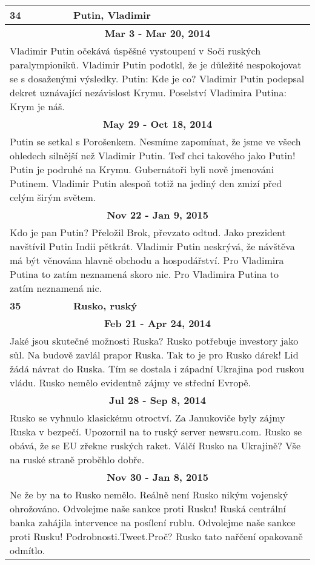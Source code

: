 \begin{tabularx}{\linewidth}{l l}
\bf 34 & \bf Putin, Vladimir \\ \midrule
\multicolumn{2}{c}{\bf Mar 3 - Mar 20, 2014} \\
\multicolumn{2}{p{\linewidth}}{Vladimir Putin očekává úspěšné vystoupení v Soči ruských paralympioniků. Vladimir Putin podotkl, že je důležité nespokojovat se s dosaženými výsledky. Putin: Kde je co? Vladimir Putin podepsal dekret uznávající nezávislost Krymu. Poselství Vladimira Putina: Krym je náš.} \\ \midrule
\multicolumn{2}{c}{\bf May 29 - Oct 18, 2014} \\
\multicolumn{2}{p{\linewidth}}{Putin se setkal s Porošenkem. Nesmíme zapomínat, že jsme ve všech ohledech silnější než Vladimir Putin. Teď chci takového jako Putin! Putin je podruhé na Krymu. Gubernátoři byli nově jmenováni Putinem. Vladimir Putin alespoň totiž na jediný den zmizí před celým širým světem.} \\ \midrule
\multicolumn{2}{c}{\bf Nov 22 - Jan 9, 2015} \\
\multicolumn{2}{p{\linewidth}}{Kdo je pan Putin? Přeložil Brok, převzato odtud. Jako prezident navštívil Putin Indii pětkrát. Vladimir Putin neskrývá, že návštěva má být věnována hlavně obchodu a hospodářství. Pro Vladimira Putina to zatím neznamená skoro nic. Pro Vladimira Putina to zatím neznamená nic.} \\ \midrule[1.5pt]

\bf 35 & \bf Rusko, ruský \\ \midrule
\multicolumn{2}{c}{\bf Feb 21 - Apr 24, 2014} \\
\multicolumn{2}{p{\linewidth}}{Jaké jsou skutečné možnosti Ruska? Rusko potřebuje investory jako sůl. Na budově zavlál prapor Ruska. Tak to je pro Rusko dárek! Lid žádá návrat do Ruska. Tím se dostala i západní Ukrajina pod ruskou vládu. Rusko nemělo evidentně zájmy ve střední Evropě.} \\ \midrule
\multicolumn{2}{c}{\bf Jul 28 - Sep 8, 2014} \\
\multicolumn{2}{p{\linewidth}}{Rusko se vyhnulo klasickému otroctví. Za Janukoviče byly zájmy Ruska v bezpečí. Upozornil na to ruský server newsru.com. Rusko se obává, že se EU zřekne ruských raket. Válčí Rusko na Ukrajině? Vše na ruské straně proběhlo dobře.} \\ \midrule
\multicolumn{2}{c}{\bf Nov 30 - Jan 8, 2015} \\
\multicolumn{2}{p{\linewidth}}{Ne že by na to Rusko nemělo. Reálně není Rusko nikým vojenský ohrožováno. Odvolejme naše sankce proti Rusku! Ruská centrální banka zahájila intervence na posílení rublu. Odvolejme naše sankce proti Rusku! Podrobnosti.Tweet.Proč? Rusko tato nařčení opakovaně odmítlo.} \\ \midrule[1.5pt]


\end{tabularx}
